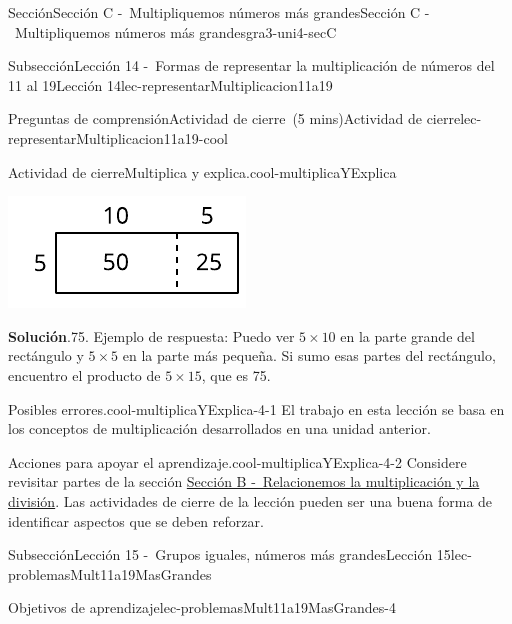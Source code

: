 \documentclass[oneside,10pt,]{article}
\newcommand{\blocktitlefont}{\relax}
\begin{document}
\begin{sectionptx}{Sección}{Sección C -~Multipliquemos números más grandes}{}{Sección C -~Multipliquemos números más grandes}{}{}{gra3-uni4-secC}
\begin{subsectionptx}{Subsección}{Lección 14 -~Formas de representar la multiplicación de números del 11 al 19}{}{Lección 14}{}{}{lec-representarMultiplicacion11a19}
\begin{reading-questions-subsubsection}{Preguntas de comprensión}{Actividad de cierre~(5 mins)}{}{Actividad de cierre}{}{}{lec-representarMultiplicacion11a19-cool}
\begin{project}{Actividad de cierre}{Multiplica y explica.}{cool-multiplicaYExplica}
\begin{sidebyside}{2}{0}{0}{0}
\begin{sbspanel}{0.4}
\includegraphics[width=\linewidth]{external/svg-source/tikz-file-147479-scale13.pdf}
\end{sbspanel}%
\end{sidebyside}%
\par\smallskip%
\noindent\textbf{\blocktitlefont Solución}.\hypertarget{cool-multiplicaYExplica-3}{}\quad{}75. Ejemplo de respuesta: Puedo ver \(5\times 10\) en la parte grande del rectángulo y \(5\times 5\) en la parte más pequeña. Si sumo esas partes del rectángulo, encuentro el producto de \(5\times 15\), que es 75.%
\end{project}%
\par
\begin{paragraphs}{Posibles errores.}{cool-multiplicaYExplica-4-1}%
El trabajo en esta lección se basa en los conceptos de multiplicación desarrollados en una unidad anterior.%
\end{paragraphs}%
\begin{paragraphs}{Acciones para apoyar el aprendizaje.}{cool-multiplicaYExplica-4-2}%
Considere revisitar partes de la sección \hyperref[gra3-uni4-secB]{Sección B -~Relacionemos la multiplicación y la división}. Las actividades de cierre de la lección pueden ser una buena forma de identificar aspectos que se deben reforzar.%
\end{paragraphs}%
\end{reading-questions-subsubsection}
\end{subsectionptx}
%
%
\typeout{************************************************}
\typeout{************************************************}
%
\begin{subsectionptx}{Subsección}{Lección 15 -~Grupos iguales, números más grandes}{}{Lección 15}{}{}{lec-problemasMult11a19MasGrandes}
\begin{objectives}{Objetivos de aprendizaje}{lec-problemasMult11a19MasGrandes-4}

\end{objectives}
\end{subsectionptx}
\end{sectionptx}
\end{document}
